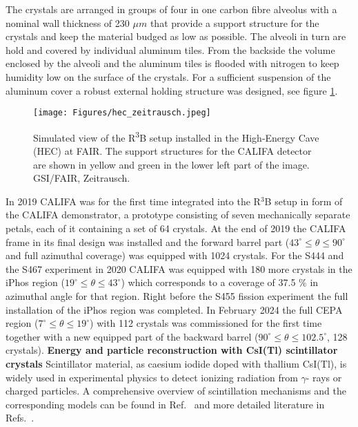 The crystals are arranged in groups of four in one carbon fibre alveolus with a nominal wall thickness of 230 $\mu m$\cite{tdr:barrel} that provide a support structure for the crystals and keep the material budged as low as possible. The alveoli in turn are hold and covered by individual aluminum tiles. From the backside the volume enclosed by the alveoli and the aluminum tiles is flooded with nitrogen to keep humidity low on the surface of the crystals. For a sufficient suspension of the aluminum cover a robust external holding structure was designed, see figure \ref{fig:califa_holding_structure}.\newline
\begin{figure}
    \centering
    \texttt{[image: Figures/hec\_zeitrausch.jpeg]}
    \caption{ 
	Simulated view of the R\textsuperscript{3}B setup installed in the High-Energy Cave (HEC) at FAIR. The support structures for the CALIFA detector are shown in yellow and green in the lower left part of the image. \textcopyright{} GSI/FAIR, Zeitrausch.
    }
    \label{fig:califa_holding_structure}

\end{figure}
In 2019 CALIFA was for the first time integrated into the R$^3$B setup in form of the CALIFA demonstrator, a prototype consisting of seven mechanically separate petals, each of it containing a set of 64 crystals.\newline
At the end of 2019 the CALIFA frame in its final design was installed and the forward barrel part ($43^{\circ} \leq \theta \leq 90^{\circ}$ and full azimuthal coverage) was equipped with 1024 crystals.\newline
For the S444 and the S467 experiment in 2020 CALIFA was equipped with 180 more crystals in the iPhos region ($19^{\circ} \leq \theta \leq 43^{\circ}$) which corresponds to a coverage of 37.5 \% in azimuthal angle for that region. Right before the S455 fission experiment \cite{grana2023fission} the full installation of the iPhos region was completed.\newline
In February 2024 the full CEPA region ($7^{\circ} \leq \theta \leq 19^{\circ}$) with 112 crystals was commissioned for the first time together with a new equipped part of the backward barrel ($90^{\circ} \leq \theta \leq 102.5^{\circ}$, 128 crystals).\newline   
\textbf{Energy and particle reconstruction with CsI(Tl) scintillator crystals}\newline
Scintillator material, as caesium iodide doped with thallium CsI(Tl), is widely used in experimental physics to detect ionizing radiation from $\gamma$- rays or charged particles. A comprehensive overview of scintillation mechanisms and the corresponding models can be found in Ref.~\cite{bendel2014entwicklung} and more detailed literature in Refs.~\cite{murray1961scintillation,zazubovich2001physics}.\newline
